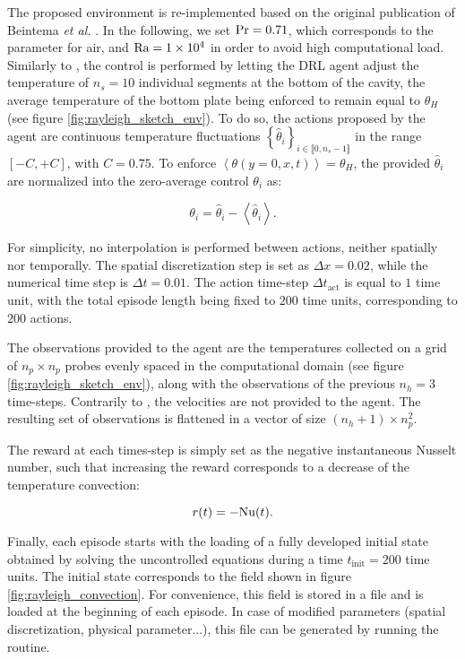 The proposed environment is re-implemented based on the original publication of Beintema \textit{et al.} \cite{beintema2020}. In the following, we set $\text{Pr}=0.71$, which corresponds to the parameter for air, and $\text{Ra} = \num{1e4}$ in order to avoid high computational load. Similarly to \cite{beintema2020}, the control is performed by letting the DRL agent adjust the temperature of $n_s=10$ individual segments at the bottom of the cavity, the average temperature of the bottom plate being enforced to remain equal to $\theta_H$ (see figure \ref{fig:rayleigh_sketch_env}). To do so, the actions proposed by the agent are continuous temperature fluctuations $\left\{ \hat{\theta}_i \right\}_{i \in \llbracket 0, n_s-1 \rrbracket}$ in the range $\left[-C, +C\right]$, with $C=0.75$. To enforce $\left< \theta(y=0,x,t) \right> = \theta_H$, the provided $\hat{\theta}_i$ are normalized into the zero-average control $\theta_i$ as:

\begin{equation}
	\theta_i = \hat{\theta}_i - \left< \hat{\theta}_i \right>.
\end{equation}

For simplicity, no interpolation is performed between actions, neither spatially nor temporally. The spatial discretization step is set as $\Delta x = 0.02$, while the numerical time step is $\Delta t = 0.01$. The action time-step $\Delta t_\text{act}$ is equal to $1$ time unit, with the total episode length being fixed to $200$ time units, corresponding to $200$ actions.



The observations provided to the agent are the temperatures collected on a grid of $n_p \times n_p$ probes evenly spaced in the computational domain (see figure \ref{fig:rayleigh_sketch_env}), along with the observations of the previous $n_h = 3$ time-steps. Contrarily to \cite{beintema2020}, the velocities are not provided to the agent. The resulting set of observations is flattened in a vector of size $(n_h+1) \times n_p^2$.

The reward at each times-step is simply set as the negative instantaneous Nusselt number, such that increasing the reward corresponds to a decrease of the temperature convection:

\begin{equation}
	r(t) = - \text{Nu} (t).
\end{equation}

Finally, each episode starts with the loading of a fully developed initial state obtained by solving the uncontrolled equations during a time $t_\text{init} = 200$ time units. The initial state corresponds to the field shown in figure \ref{fig:rayleigh_convection}. For convenience, this field is stored in a file and is loaded at the beginning of each episode. In case of modified parameters (spatial discretization, physical parameter...), this file can be generated by running the  routine.

